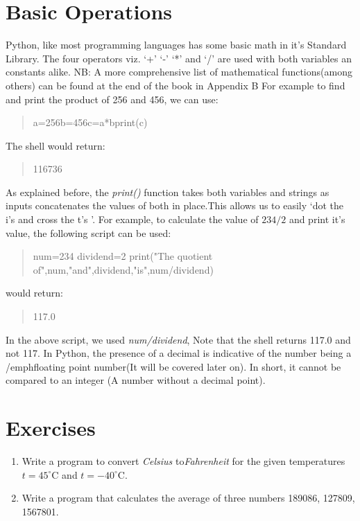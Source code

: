 \section{Basic Operations}
Python, like most programming languages has some basic math in it's Standard Library. The four operators viz. `+' `-' `*' and `/' are used with both variables an constants alike.
\newline  \newline  NB: A more comprehensive list of mathematical functions(among others) can be found at the end of the book in Appendix B\newline  \newline 
 For example to find and print the product of 256 and 456, we can use:
\begin{quote}
a=256\newline b=456\newline c=a*b\newline print(c)
\end{quote}
The shell would return:
\begin{quote}
    116736
\end{quote}
As explained before, the  \emph{print()} function takes both variables and strings as inputs concatenates the values of both in place.This allows us to easily `dot the i's and cross the t's '. For example, to calculate the value of $234/2$ and print it's value, the following script can be used:

\begin{quote}
num=234\newline 
dividend=2\newline 
print("The quotient of",num,"and",dividend,"is",num/dividend)
\end{quote}
would return:
\begin{quote}
117.0
\end{quote}

In the above script, we used \emph{num/dividend}, 
Note that the shell returns 117.0 and not 117. In Python, the presence of a decimal is indicative of the number being a /emph{floating point} number(It will be covered later on). In short, it cannot be compared to an integer (A number without a decimal point).

\newpage	
\section{Exercises}
\begin{enumerate}
\item Write a program to convert \emph{Celsius} to\emph{Fahrenheit} for the given temperatures $t=45^{\circ}$C and $t=-40^{\circ}$C.
\item Write a program that calculates the average of three numbers 189086, 127809, 1567801.
\end{enumerate}



